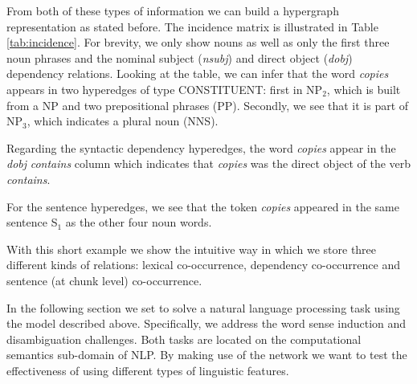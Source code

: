   From both of these types of information we can build a hypergraph representation as stated before. The incidence matrix is illustrated in Table \ref{tab:incidence}.  For brevity, we  only show nouns as well as only the first three noun phrases and the nominal subject (\textit{nsubj}) and direct object (\textit{dobj}) dependency relations. 
%
Looking at the table, we can   infer that the word \textit{copies} appears  in two hyperedges of type CONSTITUENT: first in NP$_2$, which is built from a NP  and two prepositional phrases (PP). Secondly, we see that it is part of NP$_3$, which  indicates a plural noun (NNS).

Regarding the syntactic dependency hyperedges, the word \textit{copies} appear in the \textit{dobj} \textit{contains} column which indicates that \textit{copies} was the direct object of the verb \textit{contains}.
 
For the sentence hyperedges, we see that the token \textit{copies} appeared in the same sentence S$_1$ as the other four noun words.

With this short example we show the intuitive way in which we store three different kinds of relations: lexical co-occurrence, dependency co-occurrence and sentence (at chunk level) co-occurrence.



In the following section we set to solve a natural language processing task using the model described above. Specifically, we address the word sense induction and disambiguation challenges. Both tasks are located on the computational semantics sub-domain of NLP. By making use of the network we want to test the effectiveness of using different types of linguistic features. 

